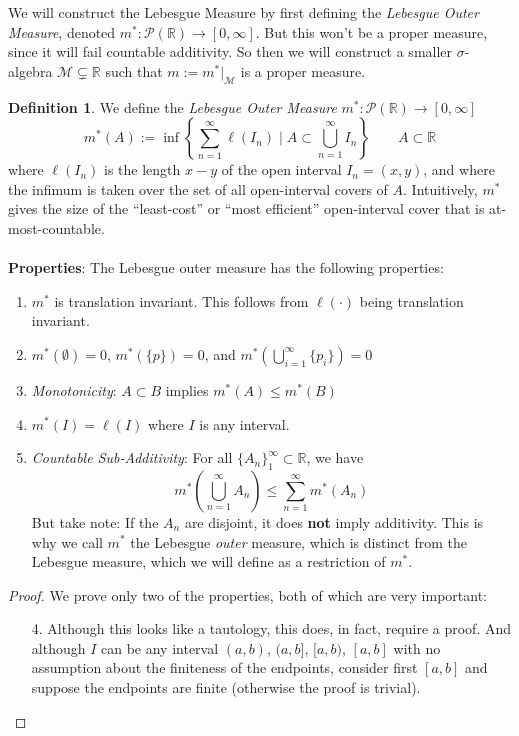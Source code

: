 \documentclass[12pt]{article}
\theoremstyle{plain}
\theoremstyle{definition}
\newtheorem{defn}[thm]{Definition}
\theoremstyle{remark}
\begin{document}
We will construct the Lebesgue Measure by first defining the \emph{Lebesgue Outer Measure}, denoted $m^*:\mathscr{P}(\mathbb{R})\rightarrow[0,\infty]$. But this won't be a proper measure, since it will fail countable additivity. So then we will construct a smaller $\sigma$-algebra $\mathscr{M}\subsetneq\mathbb{R}$ such that $m:=m^*|_\mathscr{M}$ is a proper measure.

\begin{defn}
We define the \emph{Lebesgue Outer Measure} $m^*:\mathscr{P}(\mathbb{R})\rightarrow[0,\infty]$
\[
    m^*(A) := \inf\left\{
    \sum^\infty_{n=1} \ell(I_n) \;| \;
    A \subset \bigcup^\infty_{n=1} I_n
    \right\} \qquad A \subset \mathbb{R}
\]
where $\ell(I_n)$ is the length $x-y$ of the open interval $I_n=(x,y)$, and where the infimum is taken over the set of all open-interval covers of $A$. Intuitively, $m^*$ gives the size of the ``least-cost'' or ``most efficient'' open-interval cover that is at-most-countable.
\\
\\
\textbf{Properties}: The Lebesgue outer measure has the following properties:
\begin{enumerate}

\item $m^*$ is translation invariant. This follows from $\ell(\cdot)$ being translation invariant. 

\item $m^*(\emptyset)=0$, $m^*(\{p\})=0$, and $m^*\left(\bigcup^\infty_{i=1} \{p_i\}\right)=0$

\item \emph{Monotonicity}: $A\subset B$ implies $m^*(A)\leq m^*(B)$

\item $m^*(I)=\ell(I)$ where $I$ is any interval.

\item \emph{Countable Sub-Additivity}: For all $\{A_n\}^\infty_1\subset\mathbb{R}$, we have
\[
    m^*\left(\bigcup^\infty_{n=1}A_n\right) \leq
    \sum^\infty_{n=1}m^*\left(A_n\right) 
\]
But take note: If the $A_n$ are disjoint, it does \textbf{not} imply additivity. This is why we call $m^*$ the Lebesgue \emph{outer} measure, which is distinct from the Lebesgue measure, which we will define as a restriction of $m^*$.

\end{enumerate}

\begin{proof}
We prove only two of the properties, both of which are very important:
\begin{enumerate}
\item[4.] Although this looks like a tautology, this does, in fact, require a proof. And although $I$ can be any interval $(a,b)$, $(a,b]$, $[a,b)$, $[a,b]$ with no assumption about the finiteness of the endpoints, consider first $[a,b]$ and suppose the endpoints are finite (otherwise the proof is trivial).


\end{enumerate}
\end{proof}
\end{defn}
\end{document}
